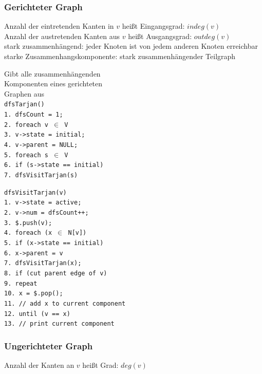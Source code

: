 \documentclass[fs, footer]{latex4ei}
\renewcommand{\t}{\texttt}
\begin{document}
\begin{multicols*}{4}
{{\subsubsection{Gerichteter Graph}
Anzahl der eintretenden Kanten in $v$ heißt Eingangsgrad: $indeg(v)$\\
Anzahl der austretenden Kanten aus $v$ heißt Ausgangsgrad: $outdeg(v)$\\

stark zusammenhängend: jeder Knoten ist von jedem anderen Knoten erreichbar\\
starke Zusammenhangskomponente: stark zusammenhängender Teilgraph\\

\parbox{3.6cm}{
	Gibt alle zusammenhängenden\\ Komponenten eines gerichteten\\ Graphen aus\\
	\t{dfsTarjan()\\
	1.	dfsCount = 1;\\
	2.	foreach v $\in$ V\\
	3.	\quad v->state = initial;\\
	4.	\quad v->parent = NULL;\\
	5.	foreach s $\in$ V\\
	6.	\quad if (s->state == initial)\\
	7.	\quad \quad dfsVisitTarjan(s)\\
}}\hspace{-.2cm}
\parbox{3.5cm}{\t{dfsVisitTarjan(v) \\
	1.	v->state = active;\\
	2.	v->num = dfsCount++;\\
	3.	\$.push(v);\\
	4.	foreach (x $\in$ N[v])\\
	5.	\quad if (x->state == initial)\\
	6.	\quad \quad x->parent = v\\
	7.	\quad \quad dfsVisitTarjan(x);\\
	8.	if (cut parent edge of v)\\
	9.	\quad repeat\\
	10.	\quad \quad x = \$.pop();\\
	11.	\quad \quad // add x to current component\\
	12. \quad until (v == x) \\
	13. \quad // print current component\\
}}

\subsubsection{Ungerichteter Graph}
Anzahl der Kanten an $v$ heißt Grad: $deg(v)$\\

}}
\end{multicols*}
\end{document}
